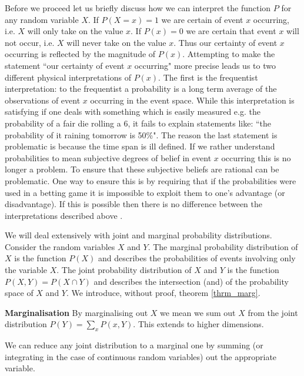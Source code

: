 Before we proceed let us briefly discuss how we can interpret the function $P$ for any random variable $X$. If $P(X=x)=1$ we are certain of event $x$ occurring, i.e. $X$ will only take on the value $x$. If $P(x)=0$ we are certain that event $x$ will not occur, i.e. $X$ will never take on the value $x$. Thus our certainty of event $x$ occurring is reflected by the magnitude of $P(x)$. Attempting to make the statement ``our certainty of event $x$ occurring" more precise leads us to two different physical interpretations of $P(x)$. The first is the frequentist interpretation: to the frequentist a probability is a long term average of the observations of event $x$ occurring in the event space. While this interpretation is satisfying if one deals with something which is easily measured e.g. the probability of a fair die rolling a 6, it fails to explain statements like: ``the probability of it raining tomorrow is 50\%". The reason the last statement is problematic is because the time span is ill defined. If we rather understand probabilities to mean subjective degrees of belief in event $x$ occurring this is no longer a problem. To ensure that these subjective beliefs are rational can be problematic. One way to ensure this is by requiring that if the probabilities were used in a betting game it is impossible to exploit them to one's advantage (or disadvantage). If this is possible then there is no difference between the interpretations described above \cite{koller}. 

We will deal extensively with joint and marginal probability distributions. Consider the random variables $X$ and $Y$. The marginal probability distribution of $X$ is the function $P(X)$ and describes the probabilities of events involving only the variable $X$. The joint probability distribution of $X$ and $Y$ is the function $P(X,Y) = P(X \cap Y)$ and describes the intersection (and) of the probability space of $X$ and $Y$. We introduce, without proof, theorem \ref{thrm_marg}.
\begin{thrm}
\textbf{Marginalisation} By marginalising out $X$ we mean we sum out $X$ from the joint distribution $P(Y) = \sum_x P(x, Y)$. This extends to higher dimensions. 
\label{thrm_marg}
\end{thrm}
We can reduce any joint distribution to a marginal one by summing (or integrating in the case of continuous random variables) out the appropriate variable. 

